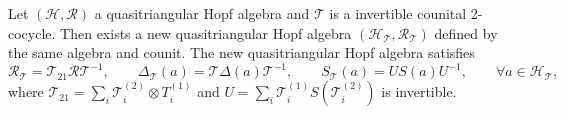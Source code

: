 \documentclass[10pt,a4paper]{amsart}
\begin{document}
\begin{theorem}\label{theorem for new quasitriangular Hopf alg}
    Let $(\mathscr{H},\mathcal{R})$ a quasitriangular Hopf algebra and $\mathcal{T}$ is a invertible counital 2-cocycle. Then exists a new quasitriangular Hopf algebra $(\mathscr{H}_\mathcal{T}, \mathcal{R}_\mathcal{T})$ defined by the same algebra and counit. The new quasitriangular Hopf algebra satisfies
\begin{equation}\label{theorem 2.4}
        \mathcal{R}_\mathcal{T}=\mathcal{T}_{21} \mathcal{R} \mathcal{T}^{-1},\qquad \Delta_\mathcal{T}(a) = \mathcal{T} \Delta(a) \mathcal{T}^{-1}, \qquad S_\mathcal{T} (a)= US(a)U^{-1}, \qquad \forall a \in \mathscr{H}_\mathcal{T},
    \end{equation}
    where $\mathcal{T}_{21} =\sum\limits_i \mathcal{T}_i^{(2)}\otimes {T}_i^{(1)}$ and $U=\sum\limits_i \mathcal{T}_i^{(1)}S\left(\mathcal{T}_i^{(2)}\right)$ is invertible.
\end{theorem}
\end{document}

